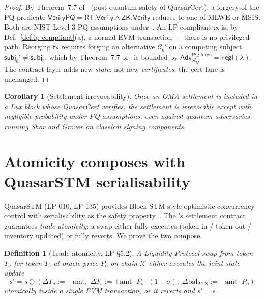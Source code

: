 \documentclass[11pt]{article}
\newtheorem{corollary}[theorem]{Corollary}
\newtheorem{definition}{Definition}
\newcommand{\amt}{\mathrm{amt}}
\newcommand{\spread}{\sigma}
\newcommand{\bal}{\mathrm{bal}}
\begin{document}
\begin{proof}
By Theorem~7.7 of~\cite{quasar-cert} (post-quantum safety of
QuasarCert), a forgery of the PQ predicate
$\mathsf{VerifyPQ} = \mathsf{RT.Verify} \land \mathsf{ZK.Verify}$
reduces to one of MLWE or MSIS.  Both are NIST-Level-3 PQ assumptions
under~\cite{nistpq}.  An LP-compliant $\mathsf{tx}$ is, by
Def.~\ref{def:lp-compliant}(a), a normal EVM transaction --- there is
no privileged path.  Reorging $\mathsf{tx}$ requires forging an
alternative $\mathcal{C}_b'$ on a competing subject
$\mathsf{subj}_b' \neq \mathsf{subj}_b$, which by Theorem~7.7
of~\cite{quasar-cert} is bounded by
$\mathsf{Adv}^{\mathrm{PQ\text{-}forge}}_{\mathcal{A}_Q} = \mathsf{negl}(\lambda)$.
The  contract layer adds new \emph{state},
not new \emph{certificates}; the cert lane is unchanged.
\end{proof}

\begin{corollary}[Settlement irrevocability]
\label{cor:settlement-irrevocable}
Once an OMA settlement is included in a Lux block whose QuasarCert
verifies, the settlement is irrevocable except with negligible
probability under PQ assumptions, even against quantum adversaries
running Shor and Grover on classical signing components.
\end{corollary}

\section{Atomicity composes with QuasarSTM serialisability}
\label{sec:compose}

QuasarSTM (LP-010, LP-135) provides Block-STM-style optimistic
concurrency control with serialisability as the safety
property~\cite{lp135}.  The 's settlement contract
guarantees \emph{trade atomicity}: a swap either fully executes
(token in / token out / inventory updated) or fully reverts.  We
prove the two compose.

\begin{definition}[Trade atomicity, LP \S5.2]
\label{def:lp-atomic}
A Liquidity-Protocol swap from token $T_a$ for token $T_b$ at
oracle price $P_o$ on chain $\mathcal{X}$ either executes the joint
state update
\[
  s' = s
       \oplus (\Delta T_a := -\amt,\;
               \Delta T_b := +\amt \cdot P_o \cdot (1-\spread),\;
               \Delta\bal_{\mathrm{ATS}} := -\amt \cdot P_o)
\]
atomically inside a single EVM transaction, or it reverts and
$s' = s$.
\end{definition}
\end{document}
